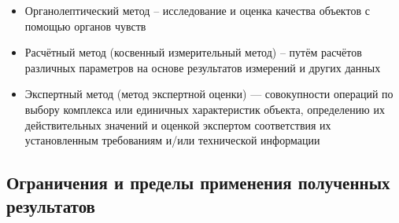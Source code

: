\begin{itemize}
\item  Органолептический метод – исследование и оценка качества объектов с помощью органов чувств
\item Расчётный метод (косвенный измерительный метод) – путём расчётов различных параметров на основе результатов измерений и других данных
\item Экспертный метод (метод экспертной оценки) — совокупности операций по выбору комплекса или единичных характеристик объекта, определению их действительных значений и оценкой экспертом соответствия их установленным требованиям и/или технической информации
\end{itemize}

\subsection{Ограничения и пределы применения полученных результатов}

